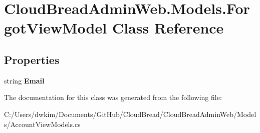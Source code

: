 \hypertarget{class_cloud_bread_admin_web_1_1_models_1_1_forgot_view_model}{}\section{Cloud\+Bread\+Admin\+Web.\+Models.\+Forgot\+View\+Model Class Reference}
\label{class_cloud_bread_admin_web_1_1_models_1_1_forgot_view_model}
\subsection*{Properties}
\begin{DoxyCompactItemize}
\item 
string {\bfseries Email}\hypertarget{class_cloud_bread_admin_web_1_1_models_1_1_forgot_view_model_a49217540654772a5e130cb60c6cd3959}{}\label{class_cloud_bread_admin_web_1_1_models_1_1_forgot_view_model_a49217540654772a5e130cb60c6cd3959}

\end{DoxyCompactItemize}


The documentation for this class was generated from the following file\+:\begin{DoxyCompactItemize}
\item 
C\+:/\+Users/dwkim/\+Documents/\+Git\+Hub/\+Cloud\+Bread/\+Cloud\+Bread\+Admin\+Web/\+Models/Account\+View\+Models.\+cs\end{DoxyCompactItemize}
